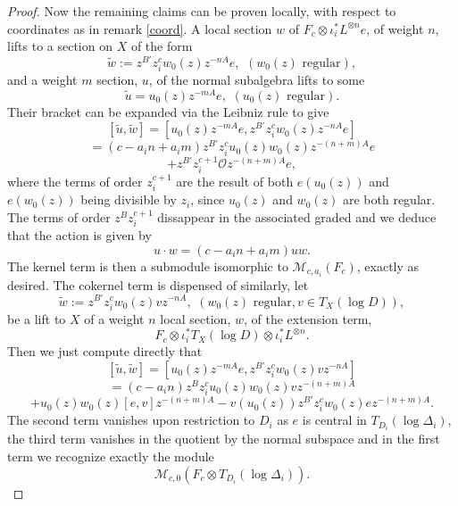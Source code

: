 \documentclass[12pt, oneside]{amsart}       %
\theoremstyle{remark}
\newcommand{\OO}{\mathcal{O}}
\begin{document}
\begin{proof}
Now the remaining claims can be proven locally, with respect to coordinates as in remark \ref{coord}. A local section $w$ of $F_c\otimes\iota_i^*L^{\otimes n}e$, of weight $n$, lifts to a section on $X$ of the form $$\widetilde{w}:=z^{B'}z_i^{c}w_0(z) z^{-nA}e,\,\ (w_0(z)\,\,\mathrm{regular}),$$ and a weight $m$ section, $u$, of the normal subalgebra lifts to some $$\widetilde{u}=u_0(z) z^{-mA}e,\,\, (u_0(z)\,\,\mathrm{regular}).$$ Their bracket can be expanded via the Leibniz rule to give $$[\widetilde{u},\widetilde{w}]=[u_0(z)z^{-mA}e,z^{B'}z_i^cw_0(z)z^{-nA}e]$$ $$=(c-a_in+a_im)z^{B'}z_i^cu_0(z)w_0(z)z^{-(n+m)A}e$$ $$+z^{B'}z_i^{c+1}\OO z^{-(n+m)A}e,$$ where the terms of order $z_i^{c+1}$ are the result of both $e(u_0(z))$ and $e(w_0(z))$ being divisible by $z_i$, since $u_0(z)$ and $w_0(z)$ are both regular. The terms of order $z^Bz_i^{c+1}$ dissappear in the associated graded and we deduce that the action is given by $$u\cdot w=(c-a_in+a_im)uw.$$ The kernel term is then a submodule isomorphic to $\mathcal{M}_{c,a_i}(F_c)$, exactly as desired. The cokernel term is dispensed of similarly, let $$\widetilde{w}:=z^{B'}z_i^cw_0(z)vz^{-nA},\,\, (w_0(z)\,\,\mathrm{regular},v\in T_{X}(\log D)),$$ be a lift to $X$ of a weight $n$ local section, $w$, of the extension term,  $$F_c\otimes\iota_i^*T_X(\log D)\otimes\iota_i^*L^{\otimes n}.$$ Then we just compute directly that $$[\widetilde{u},\widetilde{w}]=[u_0(z)z^{-mA}e,z^{B'}z_i^cw_0(z)vz^{-nA}]$$ $$=(c-a_in)z^{B}z_i^cu_0(z)w_0(z)vz^{-(n+m)A}$$ $$+u_0(z)w_0(z)[e,v]z^{-(n+m)A}-v(u_0(z))z^{B'}z_i^cw_0(z)ez^{-(n+m)A}.$$ The second term vanishes upon restriction to $D_i$ as $e$ is central in $T_{D_i}(\log\Delta_i)$, the third term vanishes in the quotient by the normal subspace and in the first term we recognize exactly the module $$\mathcal{M}_{c,0}(F_c\otimes T_{D_i}(\log\Delta_i)).$$
\end{proof}
\end{document}
